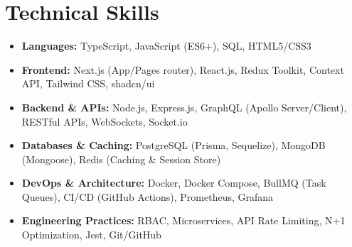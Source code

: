 \documentclass[10pt]{article}
\begin{document}
\section{Technical Skills}
\small
\begin{itemize}[leftmargin=0.15in, label={}, noitemsep]
  \item \textbf{Languages:} TypeScript, JavaScript (ES6+), SQL, HTML5/CSS3
  \item \textbf{Frontend:} Next.js (App/Pages router), React.js, Redux Toolkit, Context API, Tailwind CSS, shadcn/ui
  \item \textbf{Backend \& APIs:} Node.js, Express.js, GraphQL (Apollo Server/Client), RESTful APIs, WebSockets, Socket.io
  \item \textbf{Databases \& Caching:} PostgreSQL (Prisma, Sequelize), MongoDB (Mongoose), Redis (Caching \& Session Store)
  \item \textbf{DevOps \& Architecture:} Docker, Docker Compose, BullMQ (Task Queues), CI/CD (GitHub Actions), Prometheus, Grafana
  \item \textbf{Engineering Practices:} RBAC, Microservices, API Rate Limiting, N+1 Optimization, Jest, Git/GitHub
\end{itemize}

\end{document}

